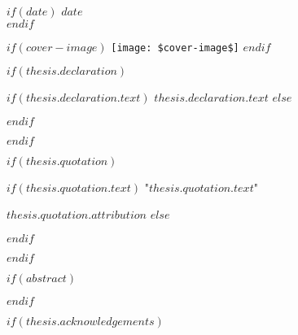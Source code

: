 \begin{titlepage}
\begin{center}
\vfill

$if(date)$
{\large $date$}\\[4cm] %
$endif$

$if(cover-image)$
\texttt{[image: \$cover-image\$]} %
$endif$
 
\vfill
\end{center}
\end{titlepage}

$if(thesis.declaration)$
\begin{declaration}
\addchaptertocentry{\authorshipname} %
$if(thesis.declaration.text)$
$thesis.declaration.text$
$else$

$endif$

\end{declaration}

\cleardoublepage
$endif$

$if(thesis.quotation)$

\vspace*{0.2\textheight}

$if(thesis.quotation.text)$
\noindent"{\itshape $thesis.quotation.text$}"\bigbreak

\hfill $thesis.quotation.attribution$
$else$

$endif$

$endif$

$if(abstract)$

\begin{abstract}
\addchaptertocentry{\abstractname} %
$abstract$
\end{abstract}

$endif$

$if(thesis.acknowledgements)$

